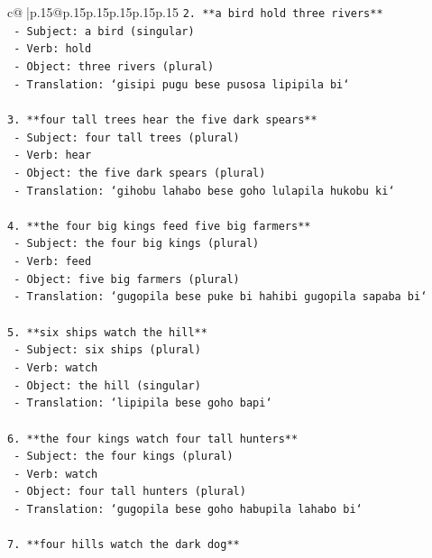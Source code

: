 \documentclass{article}
\begin{document}
{\begin{supertabular}{c@{$\;$}|p{.15\linewidth}@{}p{.15\linewidth}p{.15\linewidth}p{.15\linewidth}p{.15\linewidth}p{.15\linewidth}}
{{{\texttt{2. **a bird hold three rivers**} \\
\texttt{   {-} Subject: a bird (singular)} \\
\texttt{   {-} Verb: hold} \\
\texttt{   {-} Object: three rivers (plural)} \\
\texttt{   {-} Translation: `gisipi pugu bese pusosa lipipila bi`} \\
\\ 
\texttt{3. **four tall trees hear the five dark spears**} \\
\texttt{   {-} Subject: four tall trees (plural)} \\
\texttt{   {-} Verb: hear} \\
\texttt{   {-} Object: the five dark spears (plural)} \\
\texttt{   {-} Translation: `gihobu lahabo bese goho lulapila hukobu ki`} \\
\\ 
\texttt{4. **the four big kings feed five big farmers**} \\
\texttt{   {-} Subject: the four big kings (plural)} \\
\texttt{   {-} Verb: feed} \\
\texttt{   {-} Object: five big farmers (plural)} \\
\texttt{   {-} Translation: `gugopila bese puke bi hahibi gugopila sapaba bi`} \\
\\ 
\texttt{5. **six ships watch the hill**} \\
\texttt{   {-} Subject: six ships (plural)} \\
\texttt{   {-} Verb: watch} \\
\texttt{   {-} Object: the hill (singular)} \\
\texttt{   {-} Translation: `lipipila bese goho bapi`} \\
\\ 
\texttt{6. **the four kings watch four tall hunters**} \\
\texttt{   {-} Subject: the four kings (plural)} \\
\texttt{   {-} Verb: watch} \\
\texttt{   {-} Object: four tall hunters (plural)} \\
\texttt{   {-} Translation: `gugopila bese goho habupila lahabo bi`} \\
\\ 
\texttt{7. **four hills watch the dark dog**} \\
}}}
\end{supertabular}}
\end{document}
